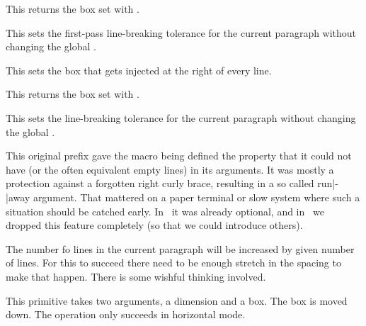 \stopnewprimitive

\startnewprimitive[title={\prm {localmiddleboxbox}}]

This returns the box set with .

\stopnewprimitive

\startnewprimitive[title={\prm {localpretolerance}}]

This sets the first-pass line-breaking tolerance for the current paragraph
without changing the global .

\stopnewprimitive

\startnewprimitive[title={\prm {localrightbox}}]

This sets the box that gets injected at the right of every line.

\stopnewprimitive

\startnewprimitive[title={\prm {localrightboxbox}}]

This returns the box set with .

\stopnewprimitive

\startnewprimitive[title={\prm {localtolerance}}]

This sets the line-breaking tolerance for the current paragraph without changing
the global .

\stopnewprimitive

\startoldprimitive[title={\prm {long}}][obsolete=yes]

This original prefix gave the macro being defined the property that it could not
have  (or the often equivalent empty lines) in its arguments. It was
mostly a protection against a forgotten right curly brace, resulting in a so called
run|-|away argument. That mattered on a paper terminal or slow system where such a
situation should be catched early. In \LUATEX\ it was already optional, and in
\LUAMETATEX\ we dropped this feature completely (so that we could introduce others).

\stopoldprimitive

\startoldprimitive[title={\prm {looseness}}]

The number fo lines in the current paragraph will be increased by given number of
lines. For this to succeed there need to be enough stretch in the spacing to make
that happen. There is some wishful thinking involved.

\stopoldprimitive

\startoldprimitive[title={\prm {lower}}]

This primitive takes two arguments, a dimension and a box. The box is moved down.
The operation only succeeds in horizontal mode.

